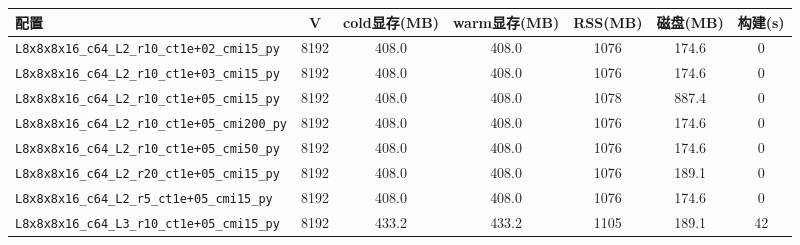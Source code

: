 \begin{tabular}{lcccccc}
\hline
配置 & V & cold显存(MB) & warm显存(MB) & RSS(MB) & 磁盘(MB) & 构建(s) \\
\hline
\texttt{L8x8x8x16\_c64\_L2\_r10\_ct1e+02\_cmi15\_py} & 8192 & 408.0 & 408.0 & 1076 & 174.6 & 0 \\
\texttt{L8x8x8x16\_c64\_L2\_r10\_ct1e+03\_cmi15\_py} & 8192 & 408.0 & 408.0 & 1076 & 174.6 & 0 \\
\texttt{L8x8x8x16\_c64\_L2\_r10\_ct1e+05\_cmi15\_py} & 8192 & 408.0 & 408.0 & 1078 & 887.4 & 0 \\
\texttt{L8x8x8x16\_c64\_L2\_r10\_ct1e+05\_cmi200\_py} & 8192 & 408.0 & 408.0 & 1076 & 174.6 & 0 \\
\texttt{L8x8x8x16\_c64\_L2\_r10\_ct1e+05\_cmi50\_py} & 8192 & 408.0 & 408.0 & 1076 & 174.6 & 0 \\
\texttt{L8x8x8x16\_c64\_L2\_r20\_ct1e+05\_cmi15\_py} & 8192 & 408.0 & 408.0 & 1076 & 189.1 & 0 \\
\texttt{L8x8x8x16\_c64\_L2\_r5\_ct1e+05\_cmi15\_py} & 8192 & 408.0 & 408.0 & 1076 & 174.6 & 0 \\
\texttt{L8x8x8x16\_c64\_L3\_r10\_ct1e+05\_cmi15\_py} & 8192 & 433.2 & 433.2 & 1105 & 189.1 & 42 \\
\hline
\end{tabular}
